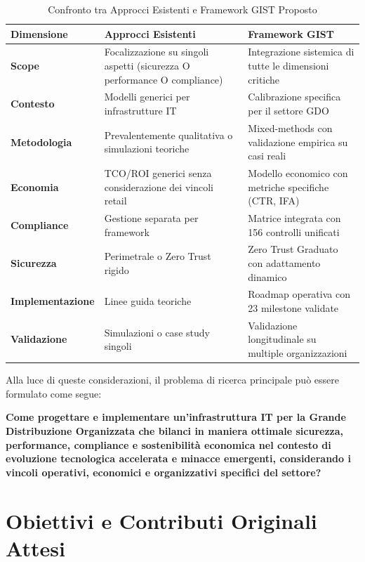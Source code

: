 \begin{table}[htbp]
\centering
\caption{Confronto tra Approcci Esistenti e Framework GIST Proposto}
\label{tab:confronto_approcci}
\begin{tabular}{|p{3.5cm}|p{5cm}|p{5cm}|}
\hline
\textbf{Dimensione} & \textbf{Approcci Esistenti} & \textbf{Framework GIST} \\
\hline
\textbf{Scope} & Focalizzazione su singoli aspetti (sicurezza O performance O compliance) & Integrazione sistemica di tutte le dimensioni critiche \\
\hline
\textbf{Contesto} & Modelli generici per infrastrutture IT & Calibrazione specifica per il settore GDO \\
\hline
\textbf{Metodologia} & Prevalentemente qualitativa o simulazioni teoriche & Mixed-methods con validazione empirica su casi reali \\
\hline
\textbf{Economia} & TCO/ROI generici senza considerazione dei vincoli retail & Modello economico con metriche specifiche (CTR, IFA) \\
\hline
\textbf{Compliance} & Gestione separata per framework & Matrice integrata con 156 controlli unificati \\
\hline
\textbf{Sicurezza} & Perimetrale o Zero Trust rigido & Zero Trust Graduato con adattamento dinamico \\
\hline
\textbf{Implementazione} & Linee guida teoriche & Roadmap operativa con 23 milestone validate \\
\hline
\textbf{Validazione} & Simulazioni o case study singoli & Validazione longitudinale su multiple organizzazioni \\
\hline
\end{tabular}
\end{table}

Alla luce di queste considerazioni, il problema di ricerca principale può essere formulato come segue:

\textbf{Come progettare e implementare un'infrastruttura IT per la Grande Distribuzione Organizzata che bilanci in maniera ottimale sicurezza, performance, compliance e sostenibilità economica nel contesto di evoluzione tecnologica accelerata e minacce emergenti, considerando i vincoli operativi, economici e organizzativi specifici del settore?}

\section{Obiettivi e Contributi Originali Attesi}

